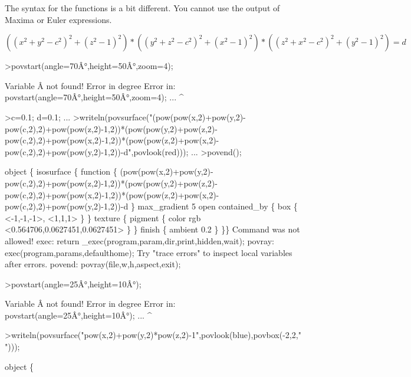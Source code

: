 \documentclass[a4paper,10pt]{article}
\begin{document}
\begin{eulernotebook}
\begin{eulercomment}
The syntax for the functions is a bit different. You cannot use the output of Maxima or Euler expressions.

\end{eulercomment}
\begin{eulerformula}
\[
((x^2+y^2-c^2)^2+(z^2-1)^2)*((y^2+z^2-c^2)^2+(x^2-1)^2)*((z^2+x^2-c^2)^2+(y^2-1)^2)=d
\]
\end{eulerformula}
\begin{eulerprompt}
>povstart(angle=70Â°,height=50Â°,zoom=4);
\end{eulerprompt}
\begin{euleroutput}
  Variable Â not found!
  Error in degree
  Error in:
  povstart(angle=70Â°,height=50Â°,zoom=4); ...
                     ^
\end{euleroutput}
\begin{eulerprompt}
>c=0.1; d=0.1; ...
>writeln(povsurface("(pow(pow(x,2)+pow(y,2)-pow(c,2),2)+pow(pow(z,2)-1,2))*(pow(pow(y,2)+pow(z,2)-pow(c,2),2)+pow(pow(x,2)-1,2))*(pow(pow(z,2)+pow(x,2)-pow(c,2),2)+pow(pow(y,2)-1,2))-d",povlook(red))); ...
>povend();
\end{eulerprompt}
\begin{euleroutput}
  object \{
  isosurface \{
  function \{ (pow(pow(x,2)+pow(y,2)-pow(c,2),2)+pow(pow(z,2)-1,2))*(pow(pow(y,2)+pow(z,2)-pow(c,2),2)+pow(pow(x,2)-1,2))*(pow(pow(z,2)+pow(x,2)-pow(c,2),2)+pow(pow(y,2)-1,2))-d \}
  max_gradient 5
  open
  contained_by \{ box \{ <-1,-1,-1>, <1,1,1>
   \} \}
   texture \{ pigment \{ color rgb <0.564706,0.0627451,0.0627451> \}  \} 
   finish \{ ambient 0.2 \} 
  \}\}
  Command was not allowed!
  exec:
      return _exec(program,param,dir,print,hidden,wait);
  povray:
      exec(program,params,defaulthome);
  Try "trace errors" to inspect local variables after errors.
  povend:
      povray(file,w,h,aspect,exit); 
\end{euleroutput}
\begin{eulerprompt}
>povstart(angle=25Â°,height=10Â°); 
\end{eulerprompt}
\begin{euleroutput}
  Variable Â not found!
  Error in degree
  Error in:
  povstart(angle=25Â°,height=10Â°);  ...
                     ^
\end{euleroutput}
\begin{eulerprompt}
>writeln(povsurface("pow(x,2)+pow(y,2)*pow(z,2)-1",povlook(blue),povbox(-2,2,"")));
\end{eulerprompt}
\begin{euleroutput}
  object \{

\end{euleroutput}
\end{eulernotebook}
\end{document}
